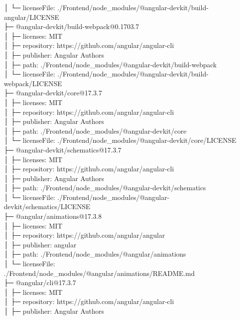 \documentclass[
    paper=a4,
    twoside=false,
    parskip=half,
    listof=entryprefix,
    listof=totoc,
    index=totoc,
    bibliography=totoc,
    headsepline,
]{scrbook}
\begin{document}
    │  └─ licenseFile: ./Frontend/node\_modules/@angular-devkit/build-angular/LICENSE\\
    ├─ @angular-devkit/build-webpack@0.1703.7\\
    │  ├─ licenses: MIT\\
    │  ├─ repository: https://github.com/angular/angular-cli\\
    │  ├─ publisher: Angular Authors\\
    │  ├─ path: ./Frontend/node\_modules/@angular-devkit/build-webpack\\
    │  └─ licenseFile: ./Frontend/node\_modules/@angular-devkit/build-webpack/LICENSE\\
    ├─ @angular-devkit/core@17.3.7\\
    │  ├─ licenses: MIT\\
    │  ├─ repository: https://github.com/angular/angular-cli\\
    │  ├─ publisher: Angular Authors\\
    │  ├─ path: ./Frontend/node\_modules/@angular-devkit/core\\
    │  └─ licenseFile: ./Frontend/node\_modules/@angular-devkit/core/LICENSE\\
    ├─ @angular-devkit/schematics@17.3.7\\
    │  ├─ licenses: MIT\\
    │  ├─ repository: https://github.com/angular/angular-cli\\
    │  ├─ publisher: Angular Authors\\
    │  ├─ path: ./Frontend/node\_modules/@angular-devkit/schematics\\
    │  └─ licenseFile: ./Frontend/node\_modules/@angular-devkit/schematics/LICENSE\\
    ├─ @angular/animations@17.3.8\\
    │  ├─ licenses: MIT\\
    │  ├─ repository: https://github.com/angular/angular\\
    │  ├─ publisher: angular\\
    │  ├─ path: ./Frontend/node\_modules/@angular/animations\\
    │  └─ licenseFile: ./Frontend/node\_modules/@angular/animations/README.md\\
    ├─ @angular/cli@17.3.7\\
    │  ├─ licenses: MIT\\
    │  ├─ repository: https://github.com/angular/angular-cli\\
    │  ├─ publisher: Angular Authors\\
\end{document}
